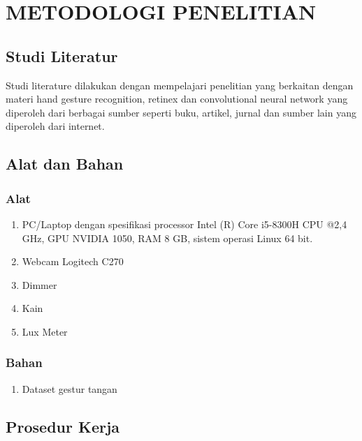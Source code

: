 \chapter{METODOLOGI PENELITIAN}
\section{Studi Literatur}
Studi literature dilakukan dengan mempelajari penelitian yang berkaitan dengan materi hand gesture recognition, retinex dan convolutional neural network yang  diperoleh dari berbagai sumber seperti buku, artikel, jurnal dan sumber lain yang diperoleh dari internet.
\section{Alat dan Bahan}
\subsection{Alat}
\begin{enumerate}
\item PC/Laptop dengan spesifikasi processor Intel (R) Core i5-8300H CPU @2,4 GHz, GPU NVIDIA 1050, RAM 8 GB, sistem operasi Linux 64 bit.
\item Webcam Logitech C270
\item Dimmer
\item Kain	
\item Lux Meter
\end{enumerate}
\subsection{Bahan}
\begin{enumerate}
	\item Dataset gestur tangan 
\end{enumerate}
\section{Prosedur Kerja}
